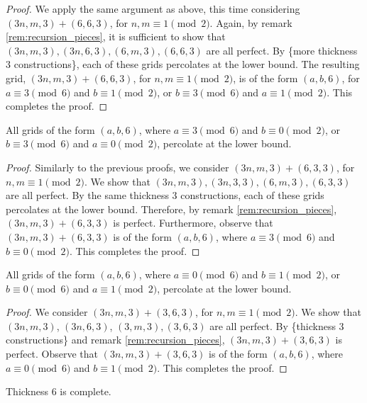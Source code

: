 \begin{proof}
We apply the same argument as above, this time considering $(3n,m,3) + (6,6,3)$, for $n,m \equiv 1 \pmod 2$. Again, by remark \ref{rem:recursion_pieces}, it is sufficient to show that $(3n,m,3), (3n,6,3), (6,m,3), (6,6,3)$ are all perfect. By \{more thickness 3 constructions\}, each of these grids percolates at the lower bound. The resulting grid, $(3n,m,3) + (6,6,3)$, for $n,m \equiv 1 \pmod 2$, is of the form $(a,b,6)$, for $a \equiv 3 \pmod 6$ and $b \equiv 1 \pmod 2$, or $b \equiv 3 \pmod 6$ and $a \equiv 1 \pmod 2$. This completes the proof.
\end{proof}

\begin{lem}
\label{lem:thickness_6_case_3}
All grids of the form $(a,b,6)$, where $a \equiv 3 \pmod 6$ and $b \equiv 0 \pmod 2$, or $b \equiv 3 \pmod 6$ and $a \equiv 0 \pmod 2$, percolate at the lower bound.
\end{lem}

\begin{proof}
Similarly to the previous proofs, we consider $(3n,m,3) + (6,3,3)$, for $n,m \equiv 1 \pmod 2$. We show that $(3n,m,3), (3n,3,3), (6,m,3), (6,3,3)$ are all perfect. By the same thickness 3 constructions, each of these grids percolates at the lower bound. Therefore, by remark \ref{rem:recursion_pieces}, $(3n,m,3) + (6,3,3)$ is perfect. Furthermore, observe that $(3n,m,3) + (6,3,3)$ is of the form $(a,b,6)$, where $a \equiv 3 \pmod 6$ and $b \equiv 0 \pmod 2$. This completes the proof.
\end{proof}

\begin{lem}
\label{lem:thickness_6_case_4}
All grids of the form $(a,b,6)$, where $a \equiv 0 \pmod 6$ and $b \equiv 1 \pmod 2$, or $b \equiv 0 \pmod 6$ and $a \equiv 1 \pmod 2$, percolate at the lower bound.
\end{lem}

\begin{proof}
We consider $(3n,m,3) + (3,6,3)$, for $n,m \equiv 1 \pmod 2$. We show that $(3n,m,3)$, $(3n,6,3)$, $(3,m,3), (3,6,3)$ are all perfect. By \{thickness 3 constructions\} and remark \ref{rem:recursion_pieces}, $(3n,m,3) + (3,6,3)$ is perfect. Observe that $(3n,m,3) + (3,6,3)$ is of the form $(a,b,6)$, where $a \equiv 0 \pmod 6$ and $b \equiv 1 \pmod 2$. This completes the proof.
\end{proof}

\begin{lem}
Thickness 6 is complete.
\end{lem}

